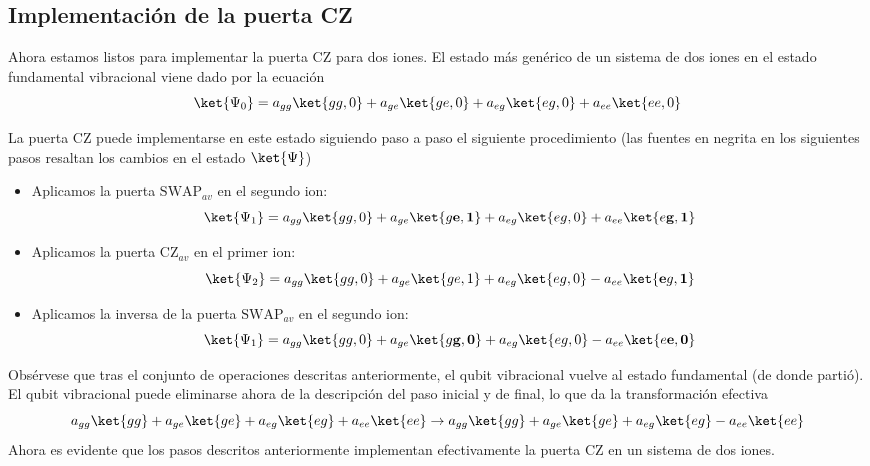 \subsection{Implementación de la puerta CZ}

Ahora estamos listos para implementar la puerta CZ para dos iones. El estado más genérico de un sistema de dos iones en el estado fundamental vibracional viene dado por la ecuación
	\begin{equation} \label{ec_ions_psi_2_ions}
	\ket{\Psi_0} = a_{gg} \ket{gg,0} + a_{ge} \ket{ge,0} + a_{eg} \ket{eg,0} + a_{ee} \ket{ee,0} 
	\end{equation}


La puerta CZ puede implementarse en este estado siguiendo paso a paso el siguiente procedimiento (las fuentes en negrita en los siguientes pasos resaltan los cambios en el estado $\ket{\Psi}$)
\begin{itemize}
\item Aplicamos la puerta $\text{SWAP}_{av}$ en el segundo ion:
	\begin{equation}
	\ket{\Psi_1} = a_{gg} \ket{gg,0} + a_{ge} \ket{g\mathbf{e},\mathbf{1}} + a_{eg} \ket{eg,0} + a_{ee} \ket{e\mathbf{g},\mathbf{1}}  
	\end{equation}
	
\item Aplicamos la puerta $\text{CZ}_{av}$ en el primer ion:
	\begin{equation}
	\ket{\Psi_2} = a_{gg} \ket{gg,0} + a_{ge} \ket{ge,1} + a_{eg} \ket{eg,0} - a_{ee} \ket{\mathbf{e}g,\mathbf{1}}  
	\end{equation}
	
\item Aplicamos la inversa de la puerta $\text{SWAP}_{av}$ en el segundo ion:
	\begin{equation}
	\ket{\Psi_1} = a_{gg} \ket{gg,0} + a_{ge} \ket{g\mathbf{g},\mathbf{0}} + a_{eg} \ket{eg,0} - a_{ee} \ket{e\mathbf{e},\mathbf{0}}  
	\end{equation}
\end{itemize}

Obsérvese que tras el conjunto de operaciones descritas anteriormente, el qubit vibracional vuelve al estado fundamental (de donde partió). El qubit vibracional puede eliminarse ahora de la descripción del paso inicial y de final, lo que da la transformación efectiva
	\begin{equation}
	a_{gg} \ket{gg} + a_{ge} \ket{ge} + a_{eg} \ket{eg} + a_{ee} \ket{ee}
	\rightarrow
	a_{gg} \ket{gg} + a_{ge} \ket{ge} + a_{eg} \ket{eg} - a_{ee} \ket{ee}
	\end{equation}
Ahora es evidente que los pasos descritos anteriormente implementan efectivamente la puerta CZ en un sistema de dos iones.


